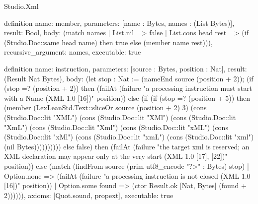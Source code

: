 \begin{lexlean}{Studio.Xml}
\begin{semanticmodule}
definition{
  name: member,
  parameters: [name : Bytes, names : (List Bytes)],
  result: Bool,
  body: (match names
    | List.nil => false
    | List.cons head rest => (if (Studio.Doc::same head name) then true else (member name rest))),
  recursive_argument: names,
  executable: true
}

definition{
  name: instruction,
  parameters: [source : Bytes, position : Nat],
  result: (Result Nat Bytes),
  body: (let stop : Nat := (nameEnd source (position + 2)); (if (stop =? (position + 2)) then (failAt (failure "a processing instruction must start with a Name (XML 1.0 [16])" position)) else (if (if (stop =? (position + 5)) then (member (LexLeanStd.Text::sliceOr source (position + 2) 3) (cons (Studio.Doc::lit "XML") (cons (Studio.Doc::lit "XMl") (cons (Studio.Doc::lit "XmL") (cons (Studio.Doc::lit "Xml") (cons (Studio.Doc::lit "xML") (cons (Studio.Doc::lit "xMl") (cons (Studio.Doc::lit "xmL") (cons (Studio.Doc::lit "xml") (nil Bytes)))))))))) else false) then (failAt (failure "the target xml is reserved; an XML declaration may appear only at the very start (XML 1.0 [17], [22])" position)) else (match (findFrom source (prim utf8_encode "?>" : Bytes) stop)
    | Option.none => (failAt (failure "a processing instruction is not closed (XML 1.0 [16])" position))
    | Option.some found => (ctor Result.ok [Nat, Bytes] (found + 2)))))),
  axioms: [Quot.sound, propext],
  executable: true
}


\end{semanticmodule}
\end{lexlean}
